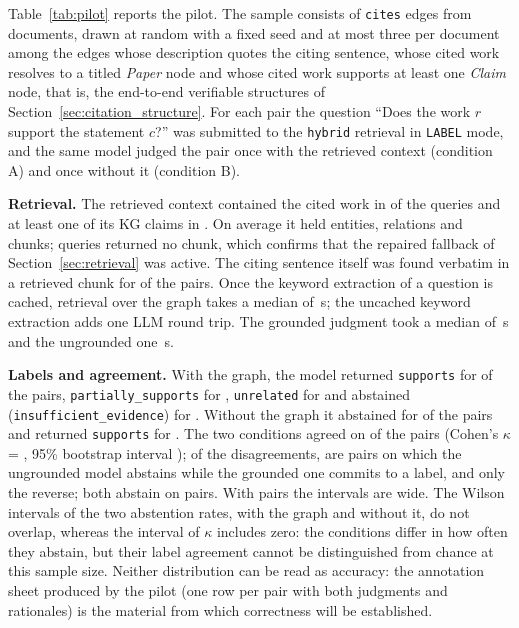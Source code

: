 \documentclass[lettersize,journal]{IEEEtran}
\begin{document}
Table~\ref{tab:pilot} reports the pilot. The sample consists of \pilotN{} \texttt{cites} edges from \pilotDocs{} documents, drawn at random with a fixed seed and at most three per document among the edges whose description quotes the citing sentence, whose cited work resolves to a titled \emph{Paper} node and whose cited work supports at least one \emph{Claim} node, that is, the end-to-end verifiable structures of Section~\ref{sec:citation_structure}. For each pair the question ``Does the work $r$ support the statement $c$?'' was submitted to the \texttt{hybrid} retrieval in \texttt{LABEL} mode, and the same model judged the pair once with the retrieved context (condition A) and once without it (condition B).

\textbf{Retrieval.} The retrieved context contained the cited work in \pilotCitedInCtxPct{} of the queries and at least one of its KG claims in \pilotClaimInCtxPct{}. On average it held \pilotEntitiesMean{} entities, \pilotRelationsMean{} relations and \pilotChunksMean{} chunks; \pilotChunksZero{} queries returned no chunk, which confirms that the repaired fallback of Section~\ref{sec:retrieval} was active. The citing sentence itself was found verbatim in a retrieved chunk for \pilotSentenceInChunksPct{} of the pairs. Once the keyword extraction of a question is cached, retrieval over the graph takes a median of \pilotRetMedian\,s; the uncached keyword extraction adds one LLM round trip. The grounded judgment took a median of \pilotAMedian\,s and the ungrounded one \pilotBMedian\,s.

\textbf{Labels and agreement.} With the graph, the model returned \texttt{supports} for \pilotASupportsPct{} of the pairs, \texttt{partially\_supports} for \pilotAPartiallySupportsPct{}, \texttt{unrelated} for \pilotAUnrelatedPct{} and abstained (\texttt{insufficient\_evidence}) for \pilotAInsufficientEvidencePct{}. Without the graph it abstained for \pilotBInsufficientEvidencePct{} of the pairs and returned \texttt{supports} for \pilotBSupportsPct{}. The two conditions agreed on \pilotAgreePct{} of the pairs (Cohen's $\kappa$ = \pilotKappa, 95\% bootstrap interval \pilotKappaCI); of the \pilotDisagree{} disagreements, \pilotBAbstainACommit{} are pairs on which the ungrounded model abstains while the grounded one commits to a label, and only \pilotAAbstainBCommit{} the reverse; both abstain on \pilotBothAbstain{} pairs. With \pilotN{} pairs the intervals are wide. The Wilson intervals of the two abstention rates, \pilotAInsufficientEvidenceCI{} with the graph and \pilotBInsufficientEvidenceCI{} without it, do not overlap, whereas the interval of $\kappa$ includes zero: the conditions differ in how often they abstain, but their label agreement cannot be distinguished from chance at this sample size. Neither distribution can be read as accuracy: the annotation sheet produced by the pilot (one row per pair with both judgments and rationales) is the material from which correctness will be established.
\end{document}
